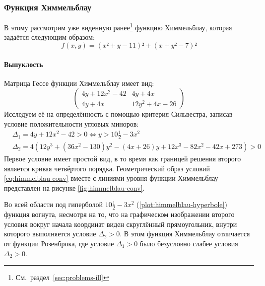 \subsubsection{Функция Химмельблау}
\label{sec:himmelblau}

В этому рассмотрим уже виденную
ранее\footnote{См. раздел \ref{sec:problems-ill}} функцию Химмельблау,
которая задаётся следующим образом:
\begin{equation}
  \label{eq:himmelblau}
  \tag{$\chi$-\theequation}
  f(x, y) = (x² + y - 11)² + (x + y² - 7)²
\end{equation}

\paragraph{Выпуклость}

Матрица Гессе функции Химмельблау имеет вид:
\begin{equation}
  \label{eq:himmelblau-hess}
  \begin{pmatrix}
    4y+12x^2-42 & 4y+4x\\
    4y+4x & 12y^2+4x-26
  \end{pmatrix}
\end{equation}
Исследуем её на определённость с помощью критерия Сильвестра, записав
условие положительности угловых миноров:
\begin{align}
  \label{eq:himmelblau-conv}
  &\Delta_1 = 4y+12x^2-42 > 0 \iff y > 10\frac{1}{2}-3x^2 \\
  &\Delta_2 =
  4\left(12y^3+(36x^2-130)y^2-(4x+26)y+12x^3-82x^2-42x+273\right) > 0
\end{align}
Первое условие имеет простой вид, в то время как границей решения
второго является кривая четвёртого порядка. Геометрический образ
условий \eqref{eq:himmelblau-conv} вместе с линиями уровня функции
Химмельблау представлен на рисунке \ref{fig:himmelblau-conv}. 

Во всей области под гиперболой $10\frac{1}{2}-3x^2$
(\ref{plot:himmelblau-hyperbole}) функция вогнута, несмотря на то, что
на графическом изображении второго условия вокруг начала координат
виден скруглённый прямоугольник, внутри которого выполняется условие
$\Delta_2>0$. В этом функция Химмельблау отличается от функции
Розенброка, где условие $\Delta_1>0$ было безусловно слабее условия
$\Delta_2>0$.

